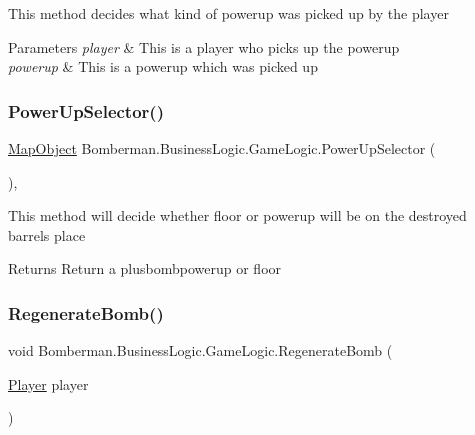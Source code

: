 This method decides what kind of powerup was picked up by the player 


\begin{DoxyParams}{Parameters}
{\em player} & This is a player who picks up the powerup\\
\hline
{\em powerup} & This is a powerup which was picked up\\
\hline
\end{DoxyParams}
\mbox{\label{class_bomberman_1_1_business_logic_1_1_game_logic_a8017ab77c9085d822dc17b0ad664052f}} 
\subsubsection{\texorpdfstring{PowerUpSelector()}{PowerUpSelector()}}
{\footnotesize\ttfamily \mbox{\hyperlink{class_bomberman_1_1_model_1_1_map_object}{Map\+Object}} Bomberman.\+Business\+Logic.\+Game\+Logic.\+Power\+Up\+Selector (\begin{DoxyParamCaption}{ }\end{DoxyParamCaption})\hspace{0.3cm}{\ttfamily [inline]}, {\ttfamily [private]}}



This method will decide whether floor or powerup will be on the destroyed barrels place 

\begin{DoxyReturn}{Returns}
Return a plusbombpowerup or floor
\end{DoxyReturn}
\mbox{\label{class_bomberman_1_1_business_logic_1_1_game_logic_adb1ba7ad7f4a7e7b0d32c2bc6b312ac1}} 
\subsubsection{\texorpdfstring{RegenerateBomb()}{RegenerateBomb()}}
{\footnotesize\ttfamily void Bomberman.\+Business\+Logic.\+Game\+Logic.\+Regenerate\+Bomb (\begin{DoxyParamCaption}\item[{\mbox{\hyperlink{class_bomberman_1_1_model_1_1_player}{Player}}}]{player }\end{DoxyParamCaption})\hspace{0.3cm}{\ttfamily [inline]}}



